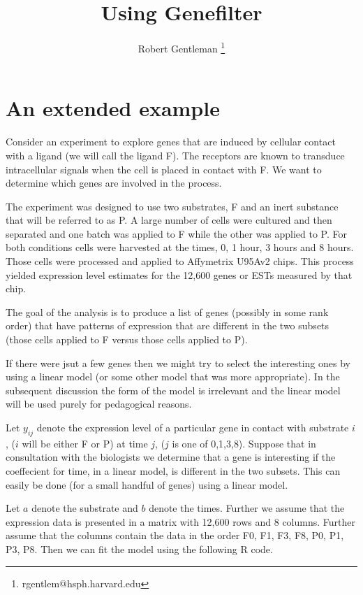 \documentclass{article}
\begin{document}
\title{Using Genefilter}
\author{Robert Gentleman \thanks{rgentlem@hsph.harvard.edu}
}
\date{}
\maketitle

\section{An extended example}

Consider an experiment to explore genes that are induced by cellular
contact with a ligand (we will call the ligand F).
The receptors are known to transduce intracellular signals when the
cell is placed in contact with F. We want to determine which genes are
involved in the process.

The experiment was designed to use two substrates, F and an inert
substance that will be referred to as P.
A large number of cells were cultured and then separated and one batch
was applied to F while the other was applied to P.
For both conditions cells were harvested at the times, 0, 1 hour, 3
hours and 8 hours. Those cells were processed and applied to
Affymetrix U95Av2 chips. This process yielded expression level
estimates for the 12,600 genes or ESTs measured by that chip.

The goal of the analysis is to produce a list of genes (possibly in
some rank order) that have patterns of expression that are different in
the two subsets (those cells applied to F versus those cells applied
to P).

If there were jsut a few genes then we might try to select the
interesting ones by using a linear model (or some other model that was
more appropriate). In the subsequent discussion the form of the model
is irrelevant and the linear model will be used purely for pedagogical
reasons.

Let $y_{ij}$ denote the expression level of a particular gene in
contact with substrate $i$, ($i$ will be either F or P) at time $j$,
($j$ is one of 0,1,3,8).
Suppose that in consultation with the biologists we determine that a
gene is interesting if the coeffecient for time, in a linear model, is
different in the two subsets.
This can easily be done (for a small handful of genes) using a linear
model. 

Let $a$ denote the substrate and $b$ denote the times. Further we
assume that the expression data is presented in a matrix with 12,600
rows and 8 columns. Further assume that the columns contain the data
in the order F0, F1, F3, F8, P0, P1, P3, P8.
Then we can fit the model using the following R code.
\end{document}
